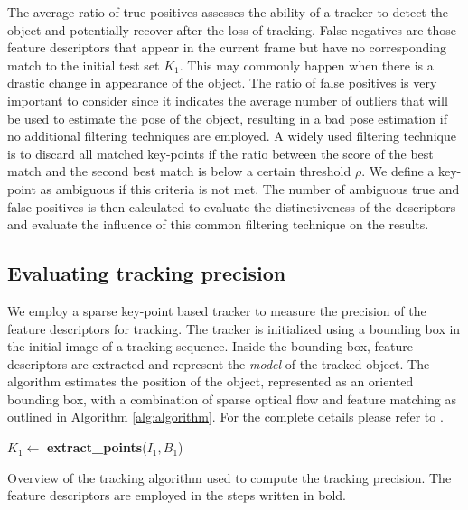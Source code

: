 The average ratio of true positives assesses the ability of a tracker to detect the object and potentially recover after the loss of tracking. False negatives are those feature descriptors that appear in the current frame but have no corresponding match to the initial test set $K_{1}$. This may commonly happen when there is a drastic change in appearance of the object. The ratio of false positives is very important to consider since it indicates the average number of outliers that will be used to estimate the pose of the object, resulting in a bad pose estimation if no additional filtering techniques are employed. A widely used filtering technique is to discard all matched key-points if the ratio between the score of the best match and the second best match is below a certain threshold $\rho$. We define a key-point as ambiguous if this criteria is not met. The  number of ambiguous true and false positives is then calculated to evaluate the distinctiveness of the descriptors and evaluate the influence of this common filtering technique on the results.

\subsection{Evaluating tracking precision}
\label{sec:accuracy}

We employ a sparse key-point based tracker to measure the precision of the feature descriptors for tracking. The tracker is initialized using a bounding box in the initial image of a tracking sequence. Inside the bounding box, feature descriptors are extracted and represent the \textit{model} of the tracked object. The algorithm estimates the position of the object, represented as an oriented bounding box, with a combination of sparse optical flow and feature matching as outlined in Algorithm \ref{alg:algorithm}. For the complete details please refer to \cite{pieropan15}.

\begin{algorithm}[!htb]
 $K_{1} \gets$ \textbf{extract\_points}($I_{1},B_1$)\;
 \caption{\label{alg:algorithm}Overview of the tracking algorithm used to compute the tracking precision. The feature descriptors are employed in the steps written in bold. }
\end{algorithm}

